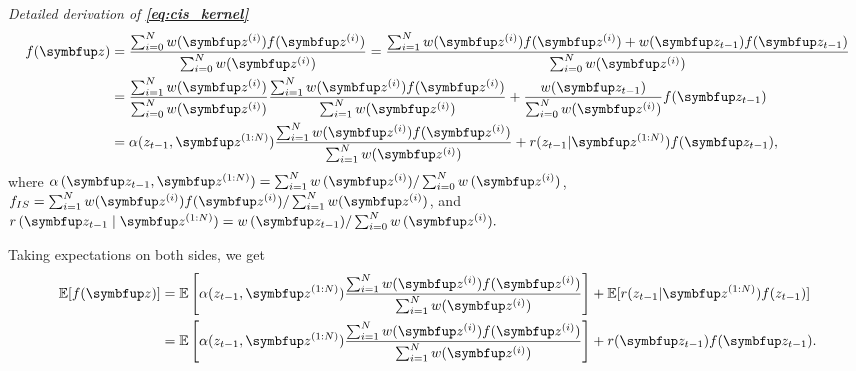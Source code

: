 

\textit{Detailed derivation of \textbf{\cref{eq:cis_kernel}}}
\begin{align}
f(\vz) &= \frac{\sum_{i=0}^N w(\vz^{(i)})f(\vz^{(i)})}{\sum_{i=0}^N w(\vz^{(i)})} = \frac{\sum_{i=1}^N w(\vz^{(i)})f(\vz^{(i)}) + w(\vz_{t-1})f(\vz_{t-1})}{\sum_{i=0}^N w(\vz^{(i)})} \\
    &=\frac{\sum_{i=1}^N w(\vz^{(i)})}{\sum_{i=0}^N w(\vz^{(i)})}\frac{\sum_{i=1}^N w(\vz^{(i)})f(\vz^{(i)})}{\sum_{i=1}^N w(\vz^{(i)})} +\frac{w(\vz_{t-1})}{\sum_{i=0}^N w(\vz^{(i)})}f(\vz_{t-1})\\
    &= \alpha(z_{t-1},\vz^{(1:N)})\frac{\sum_{i=1}^N w(\vz^{(i)})f(\vz^{(i)})}{\sum_{i=1}^N w(\vz^{(i)})} + r(z_{t-1}|\vz^{(1:N)})f(\vz_{t-1}),
\end{align}
where
    \(
    \alpha\,(\vz_{t-1}, \vz^{(1:N)}) =
      \sum^{N}_{i=1} w\,(\vz^{(i)})  
    /
      \sum^{N}_{i=0} w\,(\vz^{(i)})  
  \), $f_{IS}=\sum_{i=1}^N w(\vz^{(i)})f(\vz^{(i)})/\sum_{i=1}^N w(\vz^{(i)})$, and 
  \(
  r\,(\vz_{t-1}\mid\vz^{(1:N)}) =w\,(\vz_{t-1}) / \sum^{N}_{i=0} w\,(\vz^{(i)}).
  \)

Taking expectations on both sides, we get
\begin{align}
\mathbb{E}[f(\vz)] &= \mathbb{E}\left[ \alpha(z_{t-1},\vz^{(1:N)})\frac{\sum_{i=1}^N w(\vz^{(i)})f(\vz^{(i)})}{\sum_{i=1}^N w(\vz^{(i)})}\right] + \mathbb{E}[r(z_{t-1}|\vz^{(1:N)})f(z_{t-1})]\\
    &= \mathbb{E}\left[ \alpha(z_{t-1},\vz^{(1:N)})\frac{\sum_{i=1}^N w(\vz^{(i)})f(\vz^{(i)})}{\sum_{i=1}^N w(\vz^{(i)})}\right] + r(\vz_{t-1})f(\vz_{t-1}).
\end{align}

%

